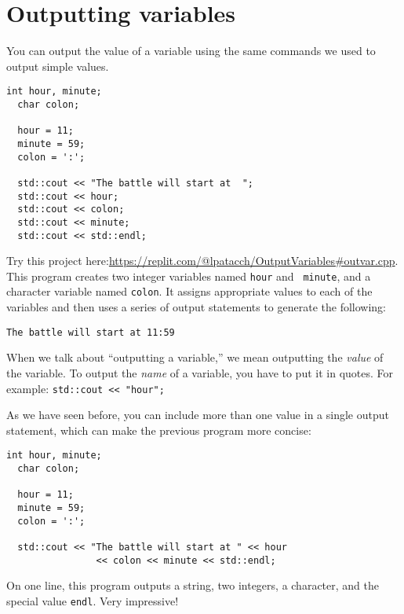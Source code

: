 \section{Outputting variables}
\label{output}

You can output the value of a variable using the same commands
we used to output simple values.

\begin{lstlisting}[frame=single]
  int hour, minute;
  char colon;

  hour = 11;
  minute = 59;
  colon = ':';

  std::cout << "The battle will start at  ";
  std::cout << hour;
  std::cout << colon;
  std::cout << minute;
  std::cout << std::endl;
\end{lstlisting}

%
Try this project here:\url{https://replit.com/@lpatacch/OutputVariables#outvar.cpp}.
This program creates two integer variables named {\tt hour} and {\tt
minute}, and a character variable named {\tt colon}.  It assigns
appropriate values to each of the variables and then uses a series
of output statements to generate the following:

\begin{verbatim}
The battle will start at 11:59
\end{verbatim}

When we talk about ``outputting a variable,'' we mean outputting the
{\em value} of the variable.  To output the {\em name} of a variable,
you have to put it in quotes.  For example: {\tt std::cout << "hour";}

As we have seen before, you can include more than one value in
a single output statement, which can make the previous program more
concise:

\begin{lstlisting}[frame=single]
  int hour, minute;
  char colon;

  hour = 11;
  minute = 59;
  colon = ':';

  std::cout << "The battle will start at " << hour 
                << colon << minute << std::endl;
\end{lstlisting}
%
On one line, this program outputs a string, two integers, a character,
and the special value {\tt endl}.  Very impressive!


